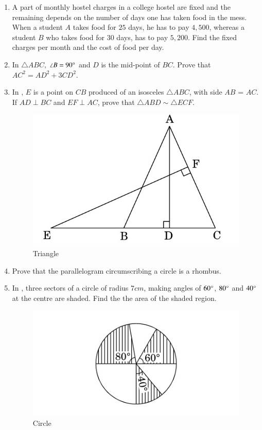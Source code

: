 \documentclass[2pt,-letter paper]{article}
\begin{document}
\begin{enumerate}
\item A part of monthly hostel charges in a college hostel are fixed and the remaining depends on the number of days one has taken food in the mess. When a student $A$ takes food for $25$ days, he has to pay {\rupee $4,500$}, whereas a student $B$ who takes food for $30$ days, has to pay {\rupee $5,200$}. Find the fixed charges per month and the cost of food per day.

\item In ${\triangle ABC}$, ${\angle B} = {90\degree}$ and $D$ is the mid-point of $BC$. Prove that ${AC}^2 = {AD}^2 + 3{CD}^2$.

\item In , $E$ is a point on $CB$ produced of an isosceles ${\triangle ABC}$, with side $AB$ = $AC$. If ${AD \perp  BC }$ and ${ EF \perp AC}$, prove that ${\triangle ABD{ \sim }\triangle ECF}$.
 \begin{figure}[H]
    \centering
    \includegraphics[width=\columnwidth]{figures/Figure_1.png}
    \caption{Triangle}
    \label{fig:Fig_1}
\end{figure}

\item Prove that the parallelogram circumscribing a circle is a rhombus.

\item In , three sectors of a circle of radius $7cm$, making angles of $60\degree$,
$80\degree$ and $40\degree$ at the centre are shaded. Find the the area of the shaded region.
\begin{figure}[H]
    \centering
    \includegraphics[width=\columnwidth]{figures/Figure_2.png}
    \caption{Circle}
    \label{fig:Fig_2}
\end{figure}


\end{enumerate}
\end{document}
